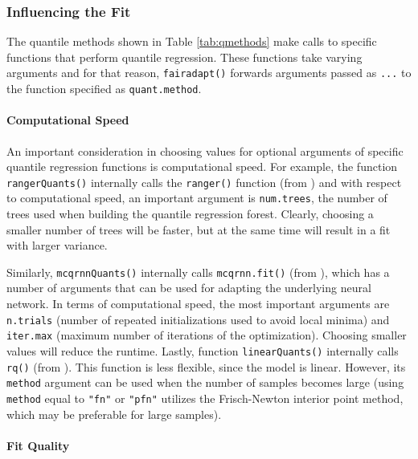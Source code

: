 \documentclass[
  nojss]{jss}
\begin{document}
\hypertarget{influencing-the-fit}{%
\subsubsection{Influencing the Fit}\label{influencing-the-fit}}

The quantile methods shown in Table \ref{tab:qmethods} make calls to
specific functions that perform quantile regression. These functions
take varying arguments and for that reason, \texttt{fairadapt()}
forwards arguments passed as \texttt{...} to the function specified as
\texttt{quant.method}.

\hypertarget{computational-speed}{%
\paragraph{Computational Speed}\label{computational-speed}}

An important consideration in choosing values for optional arguments of
specific quantile regression functions is computational speed. For
example, the function \texttt{rangerQuants()} internally calls the
\texttt{ranger()} function (from ) and with respect to
computational speed, an important argument is \texttt{num.trees}, the
number of trees used when building the quantile regression forest.
Clearly, choosing a smaller number of trees will be faster, but at the
same time will result in a fit with larger variance.

Similarly, \texttt{mcqrnnQuants()} internally calls
\texttt{mcqrnn.fit()} (from ), which has a number of arguments
that can be used for adapting the underlying neural network. In terms of
computational speed, the most important arguments are \texttt{n.trials}
(number of repeated initializations used to avoid local minima) and
\texttt{iter.max} (maximum number of iterations of the optimization).
Choosing smaller values will reduce the runtime. Lastly, function
\texttt{linearQuants()} internally calls \texttt{rq()} (from
). This function is less flexible, since the model is
linear. However, its \texttt{method} argument can be used when the
number of samples becomes large (using \texttt{method} equal to
\texttt{"fn"} or \texttt{"pfn"} utilizes the Frisch-Newton interior
point method, which may be preferable for large samples).

\hypertarget{fit-quality}{%
\paragraph{Fit Quality}\label{fit-quality}}
\end{document}

